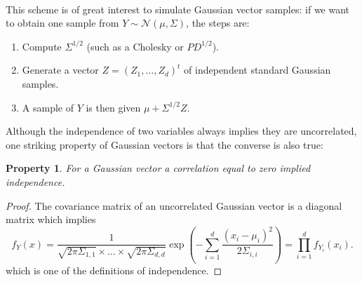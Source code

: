 \documentclass[twoside,openright]{report}
\newtheorem{property}{Property}
\begin{document}
\paragraph{}
This scheme is of great interest to simulate Gaussian vector samples: if we want to obtain one sample from $Y \sim \mathcal{N}(\mu,\Sigma)$, the steps are:
\begin{enumerate}
        \item Compute $\Sigma^{1/2}$ (such as a Cholesky or $PD^{1/2}$).
        \item Generate a vector $Z = (Z_1, \dots, Z_d)^t$ of independent standard Gaussian samples.
        \item A sample of $Y$ is then given $\mu + \Sigma^{1/2}Z$.
\end{enumerate}

Although the independence of two variables always implies they are uncorrelated, one striking property of Gaussian vectors is that the converse is also true: 
\begin{property}
	For a Gaussian vector a correlation equal to zero implied independence.
\end{property}
\begin{proof}
	The covariance matrix of an uncorrelated Gaussian vector is a diagonal matrix which implies
\begin{equation}
f_Y(x) = \frac{1}{\displaystyle \sqrt{2 \pi \Sigma_{1,1}} \times \dots \times \sqrt{2 \pi \Sigma_{d,d}}} \exp \left(- \sum_{i=1}^d \frac{(x_i-\mu_i)^2 }{2\Sigma_{i,i}}  \right) = \prod_{i=1}^d f_{Y_i}(x_i).
\end{equation}
which is one of the definitions of independence.
\end{proof}
\end{document}
